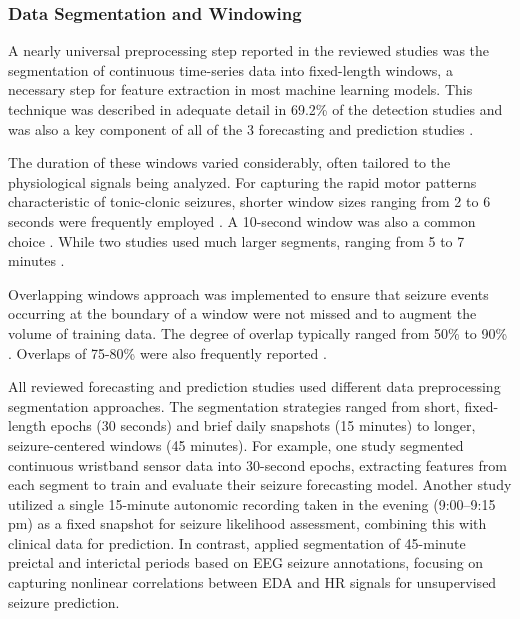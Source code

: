 \subsubsection{Data Segmentation and Windowing}
A nearly universal preprocessing step reported in the reviewed studies was the segmentation of continuous time-series data into fixed-length windows, a necessary step for feature extraction in most machine learning models. This technique was described in adequate detail in 69.2\% of the detection studies \cite{Milosevic2016-ee, De_Cooman2018-pq, Cogan2017-lg, Hamlin2021-sd, Wang2022-lt, Poh2012-af, Wu2024-yl, Nasseri2021-xn, Vakilna2024-hk, Larsen2024-vn, Dong2022-oo, Li2022-ty, Xu2022-tx, Wang2025-ql, Jiang2022-zu, Wang2025-my, Hegarty-Craver2021-hk, Chowdhury2022-bi} and was also a key component of all of the 3 forecasting and prediction studies \cite{Meisel2020-ii, Vieluf2023-zv, Vieluf2023-ta}.

The duration of these windows varied considerably, often tailored to the physiological signals being analyzed. For capturing the rapid motor patterns characteristic of tonic-clonic seizures, shorter window sizes ranging from 2 to 6 seconds were frequently employed \cite{Milosevic2016-ee, De_Cooman2018-pq, Dong2022-oo, Cogan2017-lg, Hamlin2021-sd, Wu2024-yl, Xu2022-tx, Wang2025-ql, Wang2025-my}. A 10-second window was also a common choice \cite{Poh2012-af, Nasseri2021-xn, Larsen2024-vn, Li2022-ty}. While two studies used much larger segments, ranging from 5 to 7 minutes \cite{Jiang2022-zu, Vakilna2024-hk}.

Overlapping windows approach was implemented to ensure that seizure events occurring at the boundary of a window were not missed and to augment the volume of training data. The degree of overlap typically ranged from 50\% \cite{Hamlin2021-sd, Dong2022-oo, Wang2025-ql, Vakilna2024-hk} to 90\% \cite{Wang2022-lt, Larsen2024-vn}. Overlaps of 75-80\% were also frequently reported \cite{Milosevic2016-ee, De_Cooman2018-pq, Cogan2017-lg, Poh2012-af, Wu2024-yl, Jiang2022-zu}.

All reviewed forecasting and prediction studies used different data preprocessing segmentation approaches. The segmentation strategies ranged from short, fixed-length epochs (30 seconds) and brief daily snapshots (15 minutes) to longer, seizure-centered windows (45 minutes). For example, one study \cite{Meisel2020-ii} segmented continuous wristband sensor data into 30-second epochs, extracting features from each segment to train and evaluate their seizure forecasting model. Another study \cite{Vieluf2023-zv} utilized a single 15-minute autonomic recording taken in the evening (9:00–9:15 pm) as a fixed snapshot for seizure likelihood assessment, combining this with clinical data for prediction. In contrast, \cite{Vieluf2023-ta} applied segmentation of 45-minute preictal and interictal periods based on EEG seizure annotations, focusing on capturing nonlinear correlations between EDA and HR signals for unsupervised seizure prediction.


